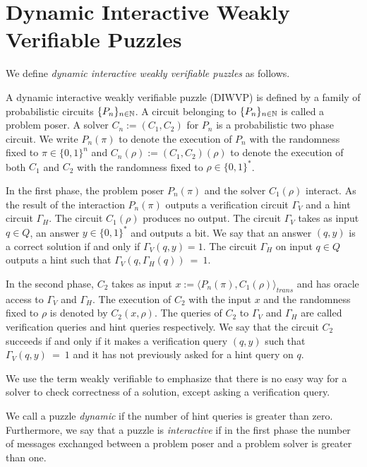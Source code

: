 \documentclass[11pt,a4paper,titlepage]{memoir}
\begin{document}
\section{Dynamic Interactive Weakly Verifiable Puzzles}
\label{section:wvp}
We define \textit{dynamic interactive weakly verifiable puzzles} as follows.
\begin{definition}
  \label{def:dwvp}
  A \textnormal{dynamic interactive weakly verifiable puzzle (DIWVP)} is defined by a family of probabilistic circuits $\{P_n\}_{n \in \mathbb{N}}$.
  A circuit belonging to $\{P_n\}_{n \in \mathbb{N}}$ is called a problem poser.
  A solver $C_n := (C_1, C_2)$ for $P_n$ is a probabilistic two phase circuit.
  We write $P_n(\pi)$ to denote the execution of $P_n$ with the randomness fixed to $\pi \in \{0,1\}^n$ and $C_n(\rho) := (C_1,C_2)(\rho)$
  to denote the execution of both $C_1$ and $C_2$ with the randomness fixed to $\rho \in \{0,1\}^{*}$.

  In the first phase, the problem poser $P_n(\pi)$ and the solver $C_1(\rho)$ interact.
  As the result of the interaction $P_n(\pi)$ outputs a verification circuit $\Gamma_{V}$ and a hint circuit $\Gamma_{H}$.
  The circuit $C_1(\rho)$ produces no output.
  The circuit $\Gamma_{V}$ takes as input $q \in Q$, an answer $y \in \{0,1\}^*$
  and outputs a bit. We say that an answer $(q,y)$ is a correct solution if and only if $\Gamma_V(q,y) = 1$.
  The circuit $\Gamma_H$ on input $q \in Q$ outputs a hint such that $\Gamma_V(q,\Gamma_H(q))~=~1$.

  In the second phase, $C_2$ takes as input $x := \langle P_n(\pi), C_1(\rho) \rangle_{\mathit{trans}}$
  and has oracle access to $\Gamma_V$ and $\Gamma_H$.
  The execution of $C_2$ with the input $x$ and the randomness fixed to $\rho$
  is denoted by $C_2(x, \rho)$. The queries of $C_2$ to $\Gamma_V$ and $\Gamma_H$ are called verification queries and hint queries respectively.
  We say that the circuit $C_2$ \textnormal{succeeds} if and only if it makes a verification query $(q,y)$ such that $\Gamma_V(q,y)~=~1$
  and it has not previously asked for a hint query on $q$.
\end{definition}

We use the term weakly verifiable to emphasize that there is no easy way
for a solver to check correctness of a solution, except asking a verification query.

We call a puzzle \textit{dynamic} if the number of hint queries is greater than zero.
Furthermore, we say that a puzzle is \textit{interactive} if in the first
phase the number of messages exchanged between a problem poser and a problem solver is greater than one.
\end{document}
